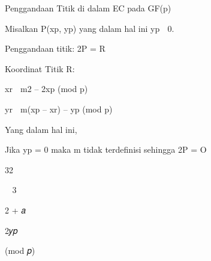 \documentclass{article}
\begin{document}

Penggandaan Titik di dalam EC pada GF(p)

Misalkan P(xp, yp) yang dalam hal ini yp  0.  

Penggandaan titik:  2P = R

Koordinat Titik R: 

     xr  m2 – 2xp  (mod p)

     yr  m(xp – xr) – yp (mod p)

Yang dalam hal ini,

Jika yp = 0 maka m tidak terdefinisi sehingga 2P = O

32

𝑚 3𝑥𝑝

2 + 𝑎

2𝑦𝑝

 (mod 𝑝)
\end{document}
